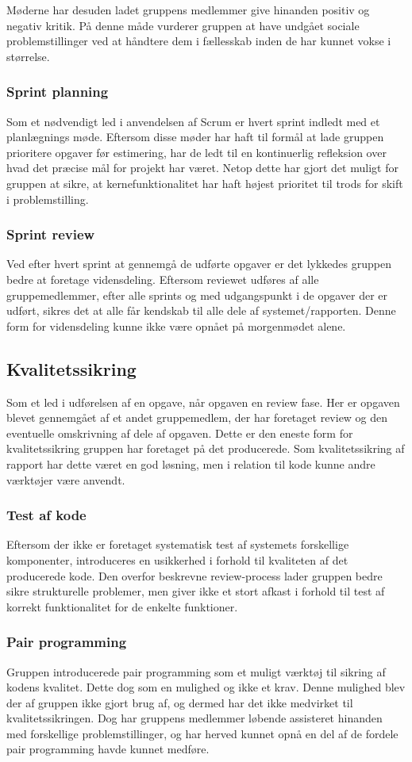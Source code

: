 Møderne har desuden ladet gruppens medlemmer give hinanden positiv og negativ kritik.
På denne måde vurderer gruppen at have undgået sociale problemstillinger ved at håndtere dem i fællesskab inden de har kunnet vokse i størrelse.

\subsubsection{Sprint planning}
Som et nødvendigt led i anvendelsen af Scrum er hvert sprint indledt med et planlægnings møde.
Eftersom disse møder har haft til formål at lade gruppen prioritere opgaver før estimering, har de ledt til en kontinuerlig refleksion over hvad det præcise mål for projekt har været.
Netop dette har gjort det muligt for gruppen at sikre, at kernefunktionalitet har haft højest prioritet til trods for skift i problemstilling.

\subsubsection{Sprint review}
Ved efter hvert sprint at gennemgå de udførte opgaver er det lykkedes gruppen bedre at foretage vidensdeling.
Eftersom reviewet udføres af alle gruppemedlemmer, efter alle sprints og med udgangspunkt i de opgaver der er udført, sikres det at alle får kendskab til alle dele af systemet/rapporten.
Denne form for vidensdeling kunne ikke være opnået på morgenmødet alene.

\subsection{Kvalitetssikring}\label{workshop3:quality}
Som et led i udførelsen af en opgave, når opgaven en review fase.
Her er opgaven blevet gennemgået af et andet gruppemedlem, der har foretaget review og den eventuelle omskrivning af dele af opgaven.
Dette er den eneste form for kvalitetssikring gruppen har foretaget på det producerede.
Som kvalitetssikring af rapport har dette været en god løsning, men i relation til kode kunne andre værktøjer være anvendt.

\subsubsection{Test af kode}
Eftersom der ikke er foretaget systematisk test af systemets forskellige komponenter, introduceres en usikkerhed i forhold til kvaliteten af det producerede kode.
Den overfor beskrevne review-process lader gruppen bedre sikre strukturelle problemer, men giver ikke et stort afkast i forhold til test af korrekt funktionalitet for de enkelte funktioner.

\subsubsection{Pair programming}
Gruppen introducerede pair programming som et muligt værktøj til sikring af kodens kvalitet.
Dette dog som en mulighed og ikke et krav.
Denne mulighed blev der af gruppen ikke gjort brug af, og dermed har det ikke medvirket til kvalitetssikringen.
Dog har gruppens medlemmer løbende assisteret hinanden med forskellige problemstillinger, og har herved kunnet opnå en del af de fordele pair programming havde kunnet medføre.